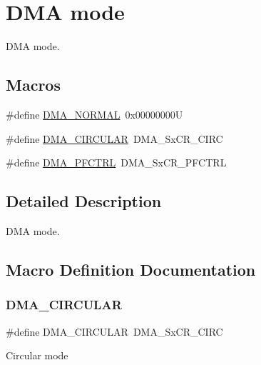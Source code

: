 \hypertarget{group___d_m_a__mode}{}\section{D\+MA mode}
\label{group___d_m_a__mode}


D\+MA mode.  


\subsection*{Macros}
\begin{DoxyCompactItemize}
\item 
\#define \mbox{\hyperlink{group___d_m_a__mode_ga04941acfbbdefc53e1e08133cffa3b8a}{D\+M\+A\+\_\+\+N\+O\+R\+M\+AL}}~0x00000000U
\item 
\#define \mbox{\hyperlink{group___d_m_a__mode_ga4c4f425cba13edffb3c831c036c91e01}{D\+M\+A\+\_\+\+C\+I\+R\+C\+U\+L\+AR}}~D\+M\+A\+\_\+\+Sx\+C\+R\+\_\+\+C\+I\+RC
\item 
\#define \mbox{\hyperlink{group___d_m_a__mode_ga7974ee645c8e275a2297cf37eec9e022}{D\+M\+A\+\_\+\+P\+F\+C\+T\+RL}}~D\+M\+A\+\_\+\+Sx\+C\+R\+\_\+\+P\+F\+C\+T\+RL
\end{DoxyCompactItemize}


\subsection{Detailed Description}
D\+MA mode. 



\subsection{Macro Definition Documentation}
\mbox{\label{group___d_m_a__mode_ga4c4f425cba13edffb3c831c036c91e01}} 
\subsubsection{\texorpdfstring{DMA\_CIRCULAR}{DMA\_CIRCULAR}}
{\footnotesize\ttfamily \#define D\+M\+A\+\_\+\+C\+I\+R\+C\+U\+L\+AR~D\+M\+A\+\_\+\+Sx\+C\+R\+\_\+\+C\+I\+RC}

Circular mode \mbox{\label{group___d_m_a__mode_ga04941acfbbdefc53e1e08133cffa3b8a}} 
